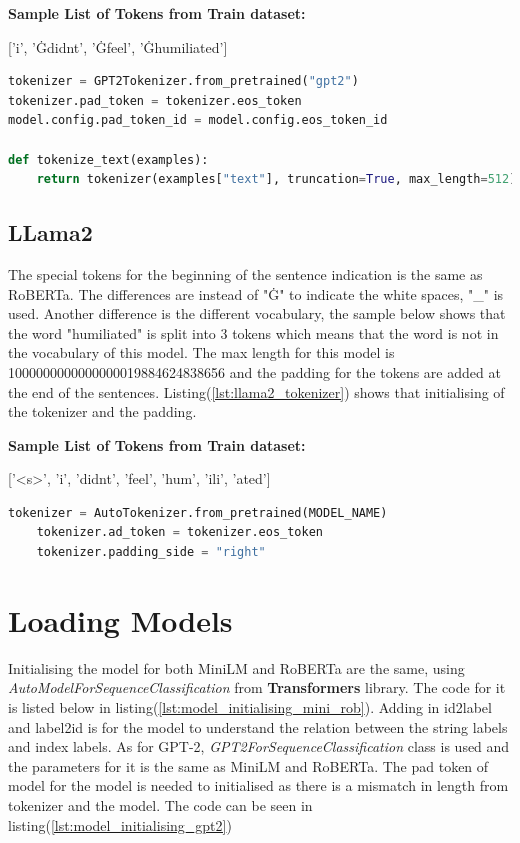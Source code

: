 \textbf{Sample List of Tokens from Train dataset:}

['i', 'Ġdidnt', 'Ġfeel', 'Ġhumiliated']\\

\begin{lstlisting}[language=Python, caption=The code for initialising tokenizer for GPT-2, label=lst:gpt2_tokenizer]
tokenizer = GPT2Tokenizer.from_pretrained("gpt2")
tokenizer.pad_token = tokenizer.eos_token
model.config.pad_token_id = model.config.eos_token_id

def tokenize_text(examples):
    return tokenizer(examples["text"], truncation=True, max_length=512)
\end{lstlisting}

\subsection{LLama2}
The special tokens for the beginning of the sentence indication is the same as RoBERTa. The differences are instead of "Ġ" to indicate the white spaces, "\_" is used. Another difference is the different vocabulary, the sample below shows that the word "humiliated" is split into 3 tokens which means that the word is not in the vocabulary of this model. The max length for this model is 1000000000000000019884624838656 and the padding for the tokens are added at the end of the sentences. Listing(\ref{lst:llama2_tokenizer}) shows that initialising of the tokenizer and the padding.

\textbf{Sample List of Tokens from Train dataset:} 

['<s>', '\textunderscore i', '\textunderscore didnt', '\textunderscore feel', '\textunderscore hum', 'ili', 'ated']

\begin{lstlisting}[language=Python, caption=The code for initialising tokenizer for LLama2, label=lst:llama2_tokenizer]
    tokenizer = AutoTokenizer.from_pretrained(MODEL_NAME)
    tokenizer.ad_token = tokenizer.eos_token
    tokenizer.padding_side = "right"
\end{lstlisting}

\section{Loading Models}

Initialising the model for both MiniLM and RoBERTa are the same, using \textit{AutoModelForSequenceClassification} from \textbf{Transformers} library. The code for it is listed below in listing(\ref{lst:model_initialising_mini_rob}). Adding in id2label and label2id is for the model to understand the relation between the string labels and index labels. As for GPT-2, \textit{GPT2ForSequenceClassification} class is used and the parameters for it is the same as MiniLM and RoBERTa. The pad token of model for the model is needed to initialised as there is a mismatch in length from tokenizer and the model. The code can be seen in listing(\ref{lst:model_initialising_gpt2})

